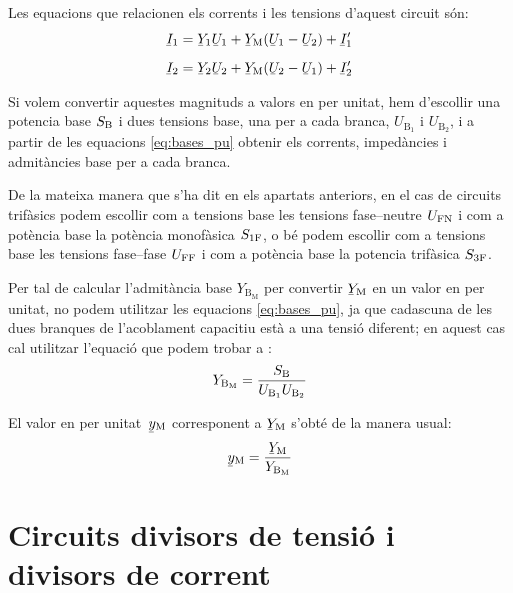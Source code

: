 \begin{center}
    
    \label{pic:pu_ym}
\end{center}

Les equacions que relacionen els corrents i les tensions d'aquest circuit són:
\begin{subequations}
\begin{align}
    \cmplx{I}_1  &= \cmplx{Y}_1 \cmplx{U}_1 +  \cmplx{Y}\ped{M}(\cmplx{U}_1-\cmplx{U}_2)  + \cmplx{I}'_1   \\[2mm]
    \cmplx{I}_2  &= \cmplx{Y}_2 \cmplx{U}_2 +  \cmplx{Y}\ped{M}(\cmplx{U}_2-\cmplx{U}_1)  + \cmplx{I}'_2
\end{align}
\end{subequations}

Si volem convertir aquestes magnituds a valors en per unitat, hem d'escollir  una potencia base $S_\mathrm{B}$ i dues tensions base, una  per a cada branca, $U_{\text{B}_1}$ i  $U_{\text{B}_2}$, i a partir de les equacions \eqref{eq:bases_pu} obtenir els corrents, impedàncies i admitàncies base per a cada branca.

De la mateixa manera que s'ha dit en els apartats anteriors, en el cas de circuits trifàsics podem escollir com a tensions base les tensions fase--neutre $U_\mathrm{FN}$ i com a potència base la potència  monofàsica $S_\mathrm{1F}$, o bé podem escollir com a tensions base les tensions fase--fase $U_\mathrm{FF}$ i com a potència base la potencia trifàsica $S_\mathrm{3F}$.


Per tal de  calcular l'admitància base $Y_{\text{B}_\text{M}}$ per convertir $\cmplx{Y}\ped{M}$ en un valor en per unitat, no podem utilitzar les equacions \eqref{eq:bases_pu}, ja que cadascuna de les dues branques de l'acoblament capacitiu està a una tensió diferent; en aquest cas cal utilitzar l'equació que podem trobar a \cite{TLE}:
\begin{equation}
    Y_{\text{B}_\text{M}} = \frac{S_\mathrm{B}}{U_{\text{B}_1} U_{\text{B}_2}}
\end{equation}

El valor en per unitat\ $\cmplx{y}\ped{M}$ corresponent a $\cmplx{Y}\ped{M}$ s'obté de la manera usual:
\begin{equation}
    \cmplx{y}\ped{M} = \frac{\cmplx{Y}\ped{M}}{Y_{\text{B}_\text{M}}}
\end{equation}


\section{Circuits divisors de tensió i divisors de corrent}\label{sec:div_tens_corr}


